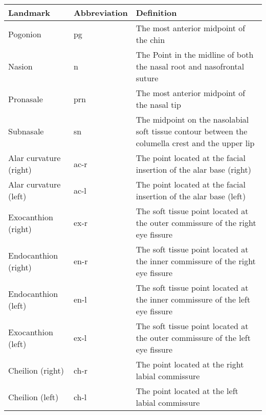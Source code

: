 \begin{table*}[!ht]

\begin{tabularx}{\textwidth}{l|l|L}
\toprule
Landmark               & Abbreviation & Definition          
\\
\midrule
Pogonion               & pg           & The most anterior midpoint of the chin                                                                              \\
Nasion                 & n            & The Point in the midline of both the nasal root and nasofrontal suture \\
Pronasale              & prn          & The most anterior midpoint of the nasal tip                                                                         \\
Subnasale              & sn           & The midpoint on the nasolabial soft tissue contour between the columella crest and the upper lip                    \\
Alar curvature (right) & ac-r         & The point located at the facial insertion of the alar base (right)                                                  \\
Alar curvature (left)  & ac-l         & The point located at the facial insertion of the alar base (left)                                                   \\
Exocanthion (right)    & ex-r         & The soft tissue point located at the outer commissure of the right eye fissure                                      \\
Endocanthion (right)   & en-r         & The soft tissue point located at the inner commissure of the right eye fissure                                       \\
Endocanthion (left)    & en-l         & The soft tissue point located at the inner commissure of the left eye fissure                                        \\
Exocanthion (left)     & ex-l         & The soft tissue point located at the outer commissure of the left eye fissure                                        \\
Cheilion (right)       & ch-r         & The point located at the right labial commissure                                                                    \\
Cheilion (left)        & ch-l         & The point located at the left labial commissure                                                                     
\end{tabularx}
\end{table*}

